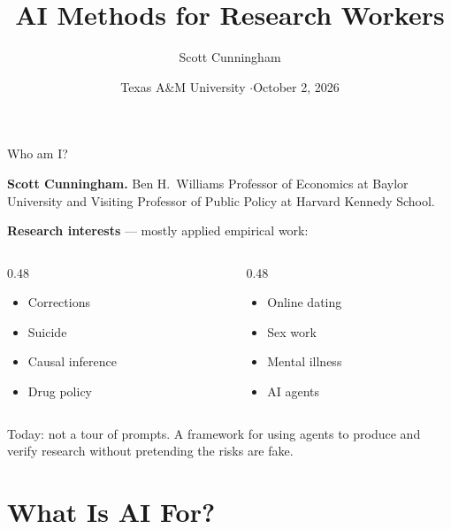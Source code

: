 \documentclass[aspectratio=169,11pt]{beamer}
\title[AI Methods for Research Workers]{AI Methods for Research Workers}
\subtitle{}
\author{Scott Cunningham}
\institute{Baylor University}
\date{Texas A\&M University \quad$\cdot$\quad October 2, 2026}
\begin{document}
\begin{frame}
\titlepage
\end{frame}

\begin{frame}{Who am I?}

\textbf{Scott Cunningham.} Ben H.\ Williams Professor of Economics at Baylor University and Visiting Professor of Public Policy at Harvard Kennedy School.

\vspace{0.2cm}

\textbf{Research interests} --- mostly applied empirical work:

\vspace{0.1cm}
\begin{columns}[T]
\begin{column}{0.48\textwidth}
\begin{itemize}\setlength\itemsep{0.05em}
    \item Corrections
    \item Suicide
    \item Causal inference
    \item Drug policy
\end{itemize}
\end{column}
\begin{column}{0.48\textwidth}
\begin{itemize}\setlength\itemsep{0.05em}
    \item Online dating
    \item Sex work
    \item Mental illness
    \item AI agents
\end{itemize}
\end{column}
\end{columns}

\vspace{0.45cm}

\alert{Today: not a tour of prompts. A framework for using agents to produce and verify research without pretending the risks are fake.}

\end{frame}


\section{What Is AI For?}
\end{document}
